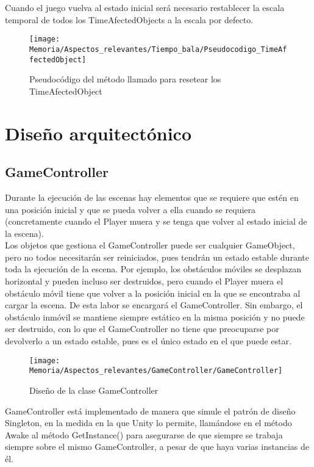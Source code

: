 Cuando el juego vuelva al estado inicial será necesario restablecer la escala temporal de todos los TimeAfectedObjects a la escala por defecto.

\begin{figure}[h]
\texttt{[image: Memoria/Aspectos\_relevantes/Tiempo\_bala/Pseudocodigo\_TimeAffectedObject]}
\caption{Pseudocódigo del método llamado para resetear los TimeAfectedObject}
\end{figure} 

\section{Diseño arquitectónico}
\subsection{GameController}
Durante la ejecución de las escenas hay elementos que se requiere que estén en una posición inicial y que se pueda volver a ella cuando se requiera (concretamente cuando el Player muera y se tenga que volver al estado inicial de la escena).\\
Los objetos que gestiona el GameController puede ser cualquier GameObject, pero no todos necesitarán ser reiniciados, pues tendrán un estado estable durante toda la ejecución de la escena. Por ejemplo, los obstáculos móviles se desplazan horizontal y pueden incluso ser destruidos, pero cuando el Player muera el obstáculo móvil tiene que volver a la posición inicial en la que se encontraba al cargar la escena. De esta labor se encargará el GameController. Sin embargo, el obstáculo inmóvil se mantiene siempre estático en la misma posición y no puede ser destruido, con lo que el GameController no tiene que preocuparse por devolverlo a un estado estable, pues es el único estado en el que puede estar.

\begin{figure}[h]
\centering
\texttt{[image: Memoria/Aspectos\_relevantes/GameController/GameController]}
\caption{Diseño de la clase GameController}
\end{figure}

GameController está implementado de manera que simule el patrón de diseño Singleton, en la medida en la que Unity lo permite, llamándose en el método Awake al método GetInstance() para asegurarse de que siempre se trabaja siempre sobre el mismo GameController, a pesar de que haya varias instancias de él.

